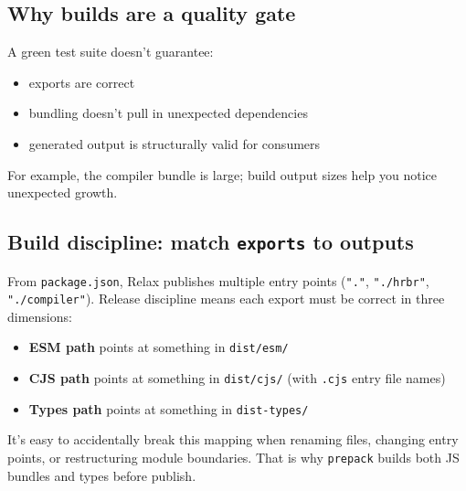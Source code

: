 \subsection{Why builds are a quality gate}

A green test suite doesn't guarantee:

\begin{itemize}
\item exports are correct
\item bundling doesn't pull in unexpected dependencies
\item generated output is structurally valid for consumers
\end{itemize}

For example, the compiler bundle is large; build output sizes help you notice unexpected growth.

\subsection{Build discipline: match \texttt{exports} to outputs}

From \texttt{package.json}, Relax publishes multiple entry points (\texttt{"."}, \texttt{"./hrbr"}, \texttt{"./compiler"}).
Release discipline means each export must be correct in three dimensions:

\begin{itemize}
\item \textbf{ESM path} points at something in \texttt{dist/esm/}
\item \textbf{CJS path} points at something in \texttt{dist/cjs/} (with \texttt{.cjs} entry file names)
\item \textbf{Types path} points at something in \texttt{dist-types/}
\end{itemize}

It's easy to accidentally break this mapping when renaming files, changing entry points, or restructuring module boundaries.
That is why \texttt{prepack} builds both JS bundles and types before publish.


